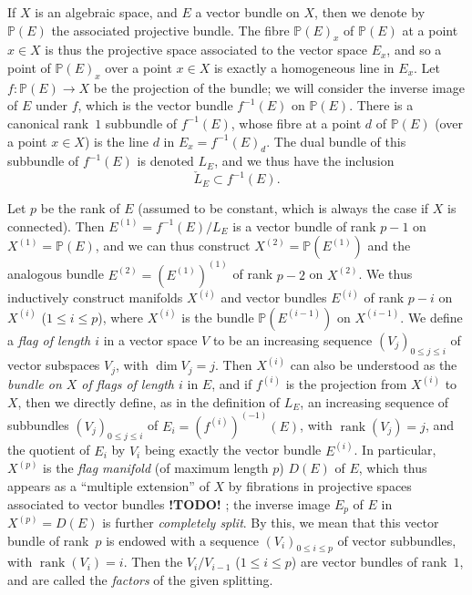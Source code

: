 \documentclass{article}
\theoremstyle{plain}
\theoremstyle{definition}
\newcommand{\PP}{\mathbb{P}}
\renewcommand{\leq}{\leqslant}
\DeclareMathOperator{\rank}{rank}
\newcommand{\todo}{\textbf{ !TODO! }}
\newcommand{\oldpage}[1]{\marginpar{\footnotesize$\Big\vert$ \textit{p.~#1}}}
\begin{document}
If $X$ is an algebraic space, and $E$ a vector bundle on $X$, then we denote by $\PP(E)$ the associated projective bundle.
The fibre $\PP(E)_x$ of $\PP(E)$ at a point $x\in X$ is thus the projective space associated to the vector space $E_x$, and so a point of $\PP(E)_x$ over a point $x\in X$ is exactly a homogeneous line in $E_x$.
Let $f\colon\PP(E)\to X$ be the projection of the bundle;
we will consider the inverse image of $E$ under $f$, which is the vector bundle $f^{-1}(E)$ on $\PP(E)$.
There is a canonical rank~$1$ subbundle of $f^{-1}(E)$, whose fibre at a point $d$ of $\PP(E)$ (over a point $x\in X$) is the line $d$ in $E_x=f^{-1}(E)_d$.
The dual bundle of this subbundle of $f^{-1}(E)$ is denoted $L_E$, and we thus have the inclusion
\[
  \check{L}_E \subset f^{-1}(E).
\]

Let $p$ be the rank of $E$ (assumed to be constant, which is always the case if $X$ is connected).
Then $E^{(1)}=f^{-1}(E)/L_E$ is a vector bundle of rank $p-1$ on $X^{(1)}=\PP(E)$, and we can thus construct $X^{(2)}=\PP(E^{(1)})$ and the analogous bundle $E^{(2)}=(E^{(1)})^{(1)}$ of rank $p-2$ on $X^{(2)}$.
We thus inductively construct manifolds $X^{(i)}$ and vector bundles $E^{(i)}$ of rank $p-i$ on $X^{(i)}$ ($1\leq i\leq p$), where $X^{(i)}$ is the bundle $\PP(E^{(i-1)})$ on $X^{(i-1)}$.
We define a \emph{flag of length $i$} in a vector space $V$ to be an increasing sequence $(V_j)_{0\leq j\leq i}$ of vector subspaces $V_j$, with $\dim V_j=j$.
Then $X^{(i)}$ can also be understood as the \emph{bundle on $X$ of flags of length $i$} in $E$, and if $f^{(i)}$ is the projection from $X^{(i)}$ to $X$, then we directly define, as in the definition of $L_E$, an increasing sequence of subbundles $(V_j)_{0\leq j\leq i}$ of $E_i=(f^{(i)})^{(-1)}(E)$, with $\rank(V_j)=j$, and the quotient of $E_i$ by $V_i$ being exactly the vector bundle $E^{(i)}$.
In particular, $X^{(p)}$ is the \emph{flag manifold} (of maximum length $p$) $D(E)$ of $E$, which thus appears as a ``multiple extension'' of $X$ by fibrations in projective spaces associated to vector bundles\todo;
the inverse image $E_p$ of $E$ in $X^{(p)}=D(E)$ is further \emph{completely split}.
By this, we mean that this vector bundle of rank~$p$ is endowed with a sequence $(V_i)_{0\leq i\leq p}$ of vector subbundles,
\oldpage{139}
with $\rank(V_i)=i$.
Then the $V_i/V_{i-1}$ ($1\leq i\leq p$) are vector bundles of rank~$1$, and are called the \emph{factors} of the given splitting.



\nocite{*}

\end{document}
